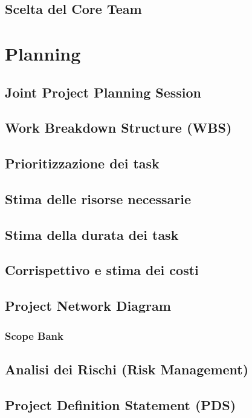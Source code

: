 \documentclass[12pt, a4paper]{article}
\begin{document}
\subsection{Scelta del Core Team}

\section{Planning}
\subsection{Joint Project Planning Session}
\subsection{Work Breakdown Structure (WBS)}
\subsection{Prioritizzazione dei task}
\subsection{Stima delle risorse necessarie}
\subsection{Stima della durata dei task}
\subsection{Corrispettivo e stima dei costi}
\subsection{Project Network Diagram}
\subsubsection{Scope Bank}

\subsection{Analisi dei Rischi (Risk Management)}

\subsection{Project Definition Statement (PDS)}
\end{document}
